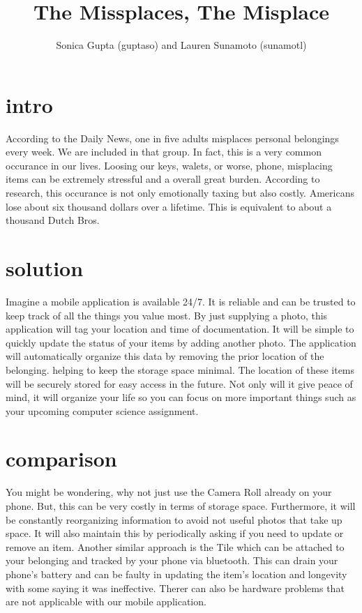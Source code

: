 \documentclass[12pt]{article}
\title{The Missplaces, The Misplace}
\author{Sonica Gupta (guptaso) and Lauren Sunamoto (sunamotl)}
\begin{document}
\maketitle 


\section{intro}
	According to the Daily News, one in five adults misplaces personal belongings every week. We are included in that group. In fact, this is a very common occurance in our lives. Loosing our keys, walets, or worse, phone, misplacing items can be extremely stressful and a overall great burden. According to research, this occurance is not only emotionally taxing but also costly. Americans lose about six thousand dollars over a lifetime. This is equivalent to about a thousand Dutch Bros. 

\section{solution}
	Imagine a mobile application is available 24/7. It is reliable and can be trusted to keep track of all the things you value most. By just supplying a photo, this application will tag your location and time of documentation. It will be simple to quickly update the status of your items by adding another photo. The application will automatically organize this data by removing the prior location of the belonging. helping to keep the storage space minimal. The location of these items will be securely stored for easy access in the future. Not only will it give peace of mind, it will organize your life so you can focus on more important things such as your upcoming computer science assignment. 


\section{comparison} 
	You might be wondering, why not just use the Camera Roll already on your phone. But, this can be very costly in terms of storage space. Furthermore, it will be constantly reorganizing information to avoid not useful photos that take up space. It will also maintain this by periodically asking if you need to update or remove an item. Another similar approach is the Tile which can be attached to your belonging and tracked by your phone via bluetooth. This can drain your phone's battery and can be faulty in updating the item's location and longevity with some saying it was ineffective. Therer can also be hardware problems that are not applicable with our mobile application. 
\end{document}
